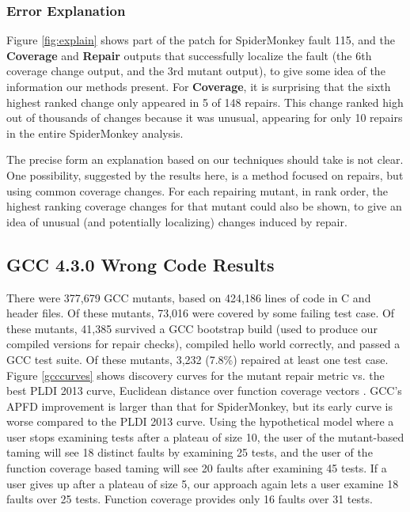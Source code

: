 \subsubsection{Error Explanation}


Figure \ref{fig:explain} shows part of the patch for SpiderMonkey fault 115, and the {\bf Coverage} and {\bf Repair} outputs that successfully localize the fault (the 6th coverage change output, and the 3rd mutant output), to give some idea of the information our methods present.  For {\bf Coverage}, it is surprising that the sixth highest ranked change only appeared in 5 of 148 repairs. This change ranked high out of thousands of changes because it was unusual, appearing for only 10 repairs in the entire SpiderMonkey analysis. 

The precise form an explanation based on our techniques should take is not clear.  One possibility, suggested by the results here, is a method focused on repairs, but using common coverage changes.  For each repairing mutant, in rank order, the highest ranking coverage changes for that mutant could also be shown, to give an idea of unusual (and potentially localizing) changes induced by repair.


\subsection{GCC 4.3.0 Wrong Code Results}


There were 377,679 GCC mutants, based on 424,186 lines of code in C and header files. Of these mutants, 73,016 were covered by some failing test case.  Of these mutants, 41,385 survived a GCC bootstrap build (used to produce our compiled versions for repair checks), compiled hello world correctly, and passed a GCC test suite.  Of these mutants, 3,232 (7.8\%) repaired at least one test case.  Figure \ref{gcccurves} shows discovery curves for the mutant repair metric vs. the best PLDI 2013 curve, Euclidean distance over function coverage vectors \cite{PLDI13}.  GCC's APFD improvement is larger than that for SpiderMonkey, but its early curve is worse compared to the PLDI 2013 curve.  Using the hypothetical model where a user stops examining tests after a plateau of size 10, the user of the mutant-based taming will see 18 distinct faults by examining 25 tests, and the user of the function coverage based taming will see 20 faults after examining 45 tests.  If a user gives up after a plateau of size 5, our approach again lets a user examine 18 faults over 25 tests.  Function coverage provides only 16 faults over 31 tests. 

